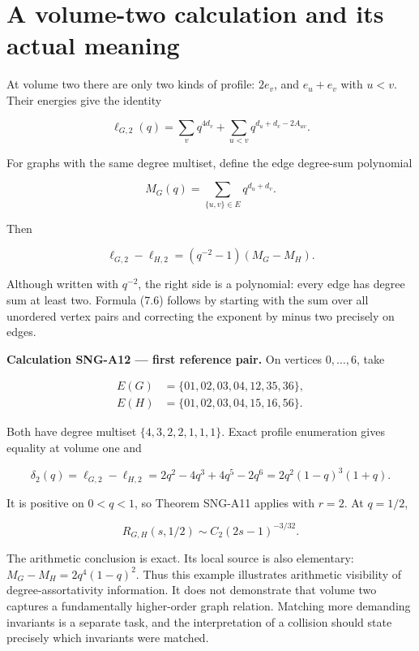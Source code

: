 \documentclass[
  11pt,
  a4paper,
]{report}
\begin{document}
\hypertarget{a-volume-two-calculation-and-its-actual-meaning}{%
\section{A volume-two calculation and its actual
meaning}\label{a-volume-two-calculation-and-its-actual-meaning}}

At volume two there are only two kinds of profile: \(2e_v\), and
\(e_u+e_v\) with \(u<v\). Their energies give the identity

\[
 \ell_{G,2}(q)=\sum_vq^{4d_v}
 +\sum_{u<v}q^{d_u+d_v-2A_{uv}}.
 \tag{7.5}
\]

For graphs with the same degree multiset, define the edge degree-sum
polynomial

\[
 M_G(q)=\sum_{\{u,v\}\in E}q^{d_u+d_v}.
\]

Then

\[
 \ell_{G,2}-\ell_{H,2}
 =(q^{-2}-1)(M_G-M_H).
 \tag{7.6}
\]

Although written with \(q^{-2}\), the right side is a polynomial: every
edge has degree sum at least two. Formula (7.6) follows by starting with
the sum over all unordered vertex pairs and correcting the exponent by
minus two precisely on edges.

\textbf{Calculation SNG-A12 --- first reference pair.} On vertices
\(0,\ldots,6\), take

\[
 \begin{aligned}
 E(G)&=\{01,02,03,04,12,35,36\},\\
 E(H)&=\{01,02,03,04,15,16,56\}.
 \end{aligned}
\]

Both have degree multiset \(\{4,3,2,2,1,1,1\}\). Exact profile
enumeration gives equality at volume one and

\[
 \delta_2(q)=\ell_{G,2}-\ell_{H,2}
 =2q^2-4q^3+4q^5-2q^6
 =2q^2(1-q)^3(1+q).
 \tag{7.7}
\]

It is positive on \(0<q<1\), so Theorem SNG-A11 applies with \(r=2\). At
\(q=1/2\),

\[
 R_{G,H}(s,1/2)\sim C_2(2s-1)^{-3/32}.
\]

The arithmetic conclusion is exact. Its local source is also elementary:
\(M_G-M_H=2q^4(1-q)^2\). Thus this example illustrates arithmetic
visibility of degree-assortativity information. It does not demonstrate
that volume two captures a fundamentally higher-order graph relation.
Matching more demanding invariants is a separate task, and the
interpretation of a collision should state precisely which invariants
were matched.
\end{document}
